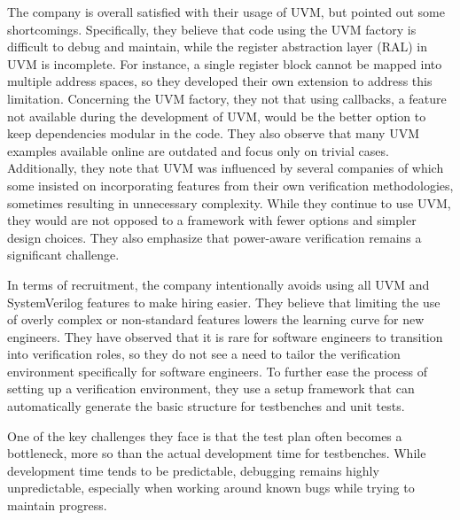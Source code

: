 \documentclass[12pt]{report}
\begin{document}
The company is overall satisfied with their usage of UVM, but pointed out some shortcomings. Specifically, they
believe that code using the UVM factory is difficult to debug and maintain, while the register abstraction layer
(RAL) in UVM is incomplete. For instance, a single register block cannot be mapped into multiple address spaces, so
they developed their own extension to address this limitation. Concerning the UVM factory, they not that using
callbacks, a feature not available during the development of UVM, would be the better option to keep dependencies
modular in the code. They also observe that many UVM examples available online are outdated and focus only on trivial
cases. Additionally, they note that UVM was influenced by several companies of which some insisted on incorporating
features from their own verification methodologies, sometimes resulting in unnecessary complexity. While they
continue to use UVM, they would are not opposed to a framework with fewer options and simpler design choices. They
also emphasize that power-aware verification remains a significant challenge.

In terms of recruitment, the company intentionally avoids using all UVM and SystemVerilog features to make hiring
easier. They believe that limiting the use of overly complex or non-standard features lowers the learning curve for
new engineers. They have observed that it is rare for software engineers to transition into verification roles, so
they do not see a need to tailor the verification environment specifically for software engineers. To further ease
the process of setting up a verification environment, they use a setup framework that can automatically generate the
basic structure for testbenches and unit tests.

One of the key challenges they face is that the test plan often becomes a bottleneck, more so than the actual
development time for testbenches. While development time tends to be predictable, debugging remains highly
unpredictable, especially when working around known bugs while trying to maintain progress.
\end{document}

